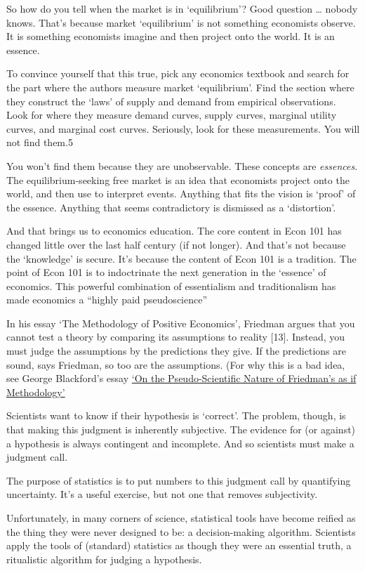 \documentclass[
]{book}
\begin{document}
So how do you tell when the market is in `equilibrium'? Good question \ldots{} nobody knows. That's because market `equilibrium' is not something economists observe. It is something economists imagine and then project onto the world. It is an essence.

To convince yourself that this true, pick any economics textbook and search for the part where the authors measure market `equilibrium'. Find the section where they construct the `laws' of supply and demand from empirical observations. Look for where they measure demand curves, supply curves, marginal utility curves, and marginal cost curves. Seriously, look for these measurements. You will not find them.5

You won't find them because they are unobservable. These concepts are \emph{essences}. The equilibrium-seeking free market is an idea that economists project onto the world, and then use to interpret events. Anything that fits the vision is `proof' of the essence. Anything that seems contradictory is dismissed as a `distortion'.

And that brings us to economics education. The core content in Econ 101 has changed little over the last half century (if not longer). And that's not because the `knowledge' is secure. It's because the content of Econ 101 is a tradition. The point of Econ 101 is to indoctrinate the next generation in the `essence' of economics. This powerful combination of essentialism and traditionalism has made economics a ``highly paid pseudoscience''

In his essay `The Methodology of Positive Economics', Friedman argues that you cannot test a theory by comparing its assumptions to reality {[}13{]}. Instead, you must judge the assumptions by the predictions they give. If the predictions are sound, says Friedman, so too are the assumptions. (For why this is a bad idea, see George Blackford's essay
\href{https://www.rweconomics.com/BPA.htm}{`On the Pseudo-Scientific Nature of Friedman's as if Methodology'}

Scientists want to know if their hypothesis is `correct'. The problem, though, is that making this judgment is inherently subjective. The evidence for (or against) a hypothesis is always contingent and incomplete. And so scientists must make a judgment call.

The purpose of statistics is to put numbers to this judgment call by quantifying uncertainty. It's a useful exercise, but not one that removes subjectivity.

Unfortunately, in many corners of science, statistical tools have become reified as the thing they were never designed to be: a decision-making algorithm. Scientists apply the tools of (standard) statistics as though they were an essential truth, a ritualistic algorithm for judging a hypothesis.
\end{document}
